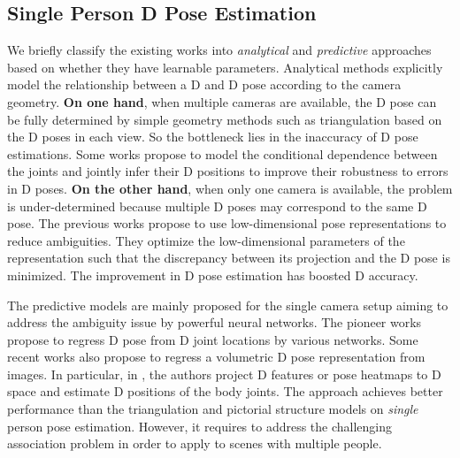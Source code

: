 \documentclass[runningheads]{llncs}
\begin{document}
\subsection{Single Person D Pose Estimation}
We briefly classify the existing works into \emph{analytical} and \emph{predictive} approaches based on whether they have learnable parameters. Analytical methods \cite{wang2014robust,qiu2019cross,amin2013multi,ramakrishna2012reconstructing} explicitly model the relationship between a D and D pose according to the camera geometry. \textbf{On one hand}, when multiple cameras are available, the D pose can be fully determined by simple geometry methods such as triangulation \cite{hartley2003multiple} based on the D poses in each view. So the bottleneck lies in the inaccuracy of D pose estimations. Some works \cite{qiu2019cross,amin2013multi} propose to model the conditional dependence between the joints and jointly infer their D positions to improve their robustness to errors in D poses. \textbf{On the other hand}, when only one camera is available, the problem is under-determined because multiple D poses may correspond to the same D pose. The previous works \cite{ramakrishna2012reconstructing,wang2014robust,zhou2016sparse} propose to use low-dimensional pose representations to reduce ambiguities. They optimize the low-dimensional parameters of the  representation such that the discrepancy between its projection and the D pose is minimized. The improvement in D pose estimation has boosted D accuracy.

The predictive models \cite{pavlakos2018ordinal,martinez2017simple,moreno20173d,sun2018integral,fang2018learning,pavllo:videopose3d:2019,bogo2016keep,iskakov2019learnable,remelli2020lightweight} are mainly proposed for the single camera setup aiming to address the ambiguity issue by powerful neural networks. The pioneer works \cite{martinez2017simple,moreno20173d} propose to regress D pose from D joint locations by various networks. Some recent works \cite{qiu2019cross,pavlakos2017coarse,pavlakos2018ordinal,zhou2017towards,iskakov2019learnable} also propose to regress a volumetric D pose representation from images. In particular, in \cite{qiu2019cross,iskakov2019learnable}, the authors project D features or pose heatmaps to D space and estimate D positions of the body joints. The approach achieves better performance than the triangulation and pictorial structure models on \emph{single} person pose estimation. However, it requires to address the challenging association problem in order to apply to scenes with multiple people.
\end{document}

